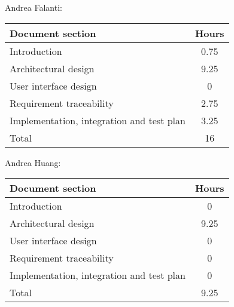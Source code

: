 Andrea Falanti:

\begin{tabular}{|l|c|}
    \hline
    Document section & Hours \\
    \hline
     Introduction & 0.75\\
     Architectural design & 9.25\\
     User interface design & 0\\
     Requirement traceability & 2.75\\
     Implementation, integration and test plan & 3.25\\
     \hline
     Total & 16\\
     \hline
\end{tabular}
\vskip 0.3in

Andrea Huang:

\begin{tabular}{|l|c|}
    \hline
    Document section & Hours \\
    \hline
     Introduction & 0\\
     Architectural design & 9.25\\
     User interface design & 0\\
     Requirement traceability & 0\\
     Implementation, integration and test plan & 0\\
     \hline
     Total & 9.25\\
     \hline
\end{tabular}